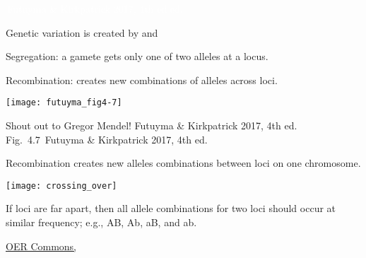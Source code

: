 \documentclass[t]{beamer}
\newcommand{\futuyma}[1]{%
	\ifthenelse{\isempty{#1}}%
	{Futuyma \& Kirkpatrick 2017, 4th ed.}%
	{Fig.~#1~Futuyma \& Kirkpatrick 2017, 4th ed.}%
}
\begin{document}


{
\begin{frame}

	\vfilll
	
	\tinyfill \textcolor{white}{\textcopyright\,Futuyma \& Kirkpatrick 2017, 4th ed ed.}
\end{frame}
}
%

\begin{frame}[t,plain]{Genetic variation is created by  and }

\begin{multicols}{2}

\hangpara Segregation: a gamete gets only one of two alleles at a locus.

\hangpara Recombination: creates new combinations of alleles across loci.

\columnbreak

\texttt{[image: futuyma\_fig4-7]}

\end{multicols}

\vfilll

\tiny Shout out to Gregor Mendel! \hfill \futuyma{4.7}

\end{frame}


\begin{frame}[t]{Recombination creates new alleles combinations between loci on one chromosome.}

\vspace{-\baselineskip}

\begin{center}
\texttt{[image: crossing\_over]}
\end{center}

\hangpara If loci are far apart, then all allele combinations for two loci should occur at similar frequency; e.g., AB, Ab, aB, and ab.

\vfilll

\tinyfill \href{https://www.oercommons.org/courseware/lesson/15023/overview}{OER Commons, }

\end{frame}

%
\end{document}
